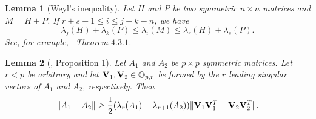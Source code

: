 \documentclass[review]{elsarticle}
\theoremstyle{plain}
\newtheorem{corollary}{\quad\quad Corollary}
\newtheorem{lemma}{\quad\quad Lemma}
\theoremstyle{definition}
\theoremstyle{remark}
\begin{document}
\begin{lemma}[Weyl's inequality]
Let $H$ and $P$ be two symmetric $n\times n$ matrices and $M=H+P$. If $r+s-1 \leq  i\leq j+k-n$, we have
\begin{equation*}
\lambda_j(H)+\lambda_k(P)\leq \lambda_i(M) \leq \lambda_r(H)+\lambda_s(P).
\end{equation*}
    See, for example,~\cite{Horn1985Matrix} Theorem $4.3.1$.
\end{lemma}

{\color{red}
\begin{lemma}[\cite{Cai2015Optimal}, Proposition 1]\label{pert}
    Let $A_1$ and $A_2$ be $p\times p$ symmetric matrices. Let $r<p$ be arbitrary and let $\mathbf{V}_1, \mathbf{V}_2\in \mathbb{O}_{p,r}$ be formed by the $r$ leading singular vectors of $A_1$ and $A_2$, respectively. Then
    $$
    \|A_1-A_2\|\geq \frac{1}{2}(\lambda_r(A_1)-\lambda_{r+1}(A_2))\|\mathbf{V}_1 \mathbf{V}_1^T- \mathbf{V}_2 \mathbf{V}_2^T\|.
    $$
\end{lemma}
}
\end{document}
